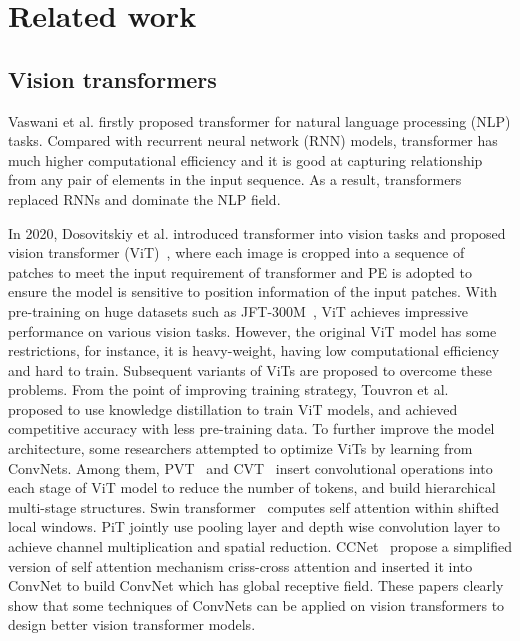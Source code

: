 \documentclass[10pt,twocolumn,letterpaper]{article}
\begin{document}
\section{Related work}


\subsection{Vision transformers}\label{sec::vit}

Vaswani et al. firstly proposed transformer \cite{vaswani2017attention} for natural language processing (NLP) tasks. Compared with recurrent neural network (RNN) models, transformer has much higher computational efficiency and it is good at capturing relationship from any pair of elements in the input sequence. As a result, transformers replaced RNNs and dominate the NLP field. 

In 2020, Dosovitskiy et al. introduced transformer into vision tasks and proposed vision transformer (ViT)~\cite{dosovitskiy2020image}, where each image is cropped into a sequence of patches to meet the input requirement of transformer and PE is adopted to ensure the model is sensitive to position information of the input patches. With pre-training on huge datasets such as JFT-300M~\cite{sun2017revisiting}, ViT achieves impressive performance on various vision tasks. However, the original ViT model has some restrictions, for instance, it is heavy-weight, having low computational efficiency and hard to train. Subsequent variants of ViTs are proposed to overcome these problems. From the point of improving training strategy, Touvron et al.~\cite{touvron2021training} proposed to use knowledge distillation to train ViT models, and achieved competitive accuracy with less pre-training data. To further improve the model architecture, some researchers attempted to optimize ViTs by learning from ConvNets. Among them, PVT~\cite{wang2021pyramid} and CVT~\cite{wu2021cvt} insert convolutional operations into each stage of ViT model to reduce the number of tokens, and build hierarchical multi-stage structures. Swin transformer~\cite{liu2021swin} computes self attention within shifted local windows. PiT \cite{heo2021rethinking} jointly use pooling layer and depth wise convolution layer to achieve channel multiplication and spatial reduction.  CCNet~\cite{huang2019ccnet} propose a simplified version of self attention mechanism criss-cross attention and inserted it into ConvNet to build ConvNet which has global receptive field. These papers clearly show that some techniques of ConvNets can be applied on vision transformers to design better vision transformer models. 
\end{document}
